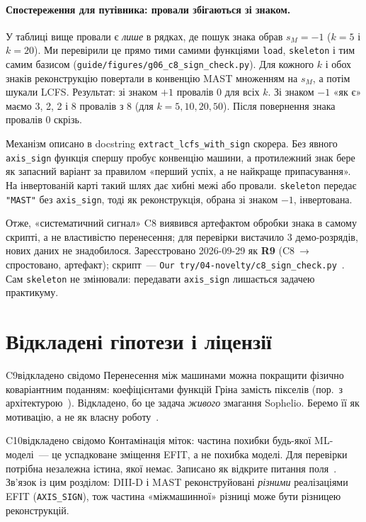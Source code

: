\paragraph{Спостереження для путівника: провали збігаються зі знаком.} У таблиці вище провали є \emph{лише} в рядках, де пошук знака обрав $s_M=-1$ ($k=5$ і $k=20$). Ми перевірили це прямо тими самими функціями \texttt{load}, \texttt{skeleton} і тим самим базисом (\texttt{guide/figures/g06\_c8\_sign\_check.py}). Для кожного $k$ і обох знаків реконструкцію повертали в конвенцію MAST множенням на $s_M$, а потім шукали LCFS. Результат: зі знаком $+1$ провалів 0 для всіх $k$. Зі знаком $-1$ «як є» маємо 3, 2, 2 і 8 провалів з 8 (для $k=5,10,20,50$). Після повернення знака провалів 0 скрізь.

Механізм описано в docstring \texttt{extract\_lcfs\_with\_sign} скорера. Без явного \texttt{axis\_sign} функція спершу пробує конвенцію машини, а протилежний знак бере як запасний варіант за правилом «перший успіх, а не найкраще припасування». На інвертованій карті такий шлях дає хибні межі або провали. \texttt{skeleton} передає \texttt{"MAST"} без \texttt{axis\_sign}, тоді як реконструкція, обрана зі знаком $-1$, інвертована.

Отже, «систематичний сигнал» C8 виявився артефактом обробки знака в самому скрипті, а не властивістю перенесення; для перевірки вистачило 3 демо-розрядів, нових даних не знадобилося. Зареєстровано 2026-09-29 як \textbf{R9} (C8~→ спростовано, артефакт); скрипт~--- \texttt{Our try/04-novelty/c8\_sign\_check.py}~\cite{RegEst,RegConj,RegLog}. Сам \texttt{skeleton} не змінювали: передавати \texttt{axis\_sign} лишається задачею практикуму.

\section{Відкладені гіпотези і ліцензії}\label{sec:g06-deferred}

\begin{itemcard}{C9}{відкладено свідомо}
Перенесення між машинами можна покращити фізично коваріантним поданням: коефіцієнтами функцій Гріна замість пікселів (пор.~з архітектурою~\cite{McClenaghan2024}). Відкладено, бо це задача \emph{живого} змагання Sophelio. Беремо її як мотивацію, а не як власну роботу~\cite{RegConj}.
\end{itemcard}

\begin{itemcard}{C10}{відкладено свідомо}
Контамінація міток: частина похибки будь-якої ML-моделі~--- це успадковане зміщення EFIT, а не похибка моделі. Для перевірки потрібна незалежна істина, якої немає. Записано як відкрите питання поля~\cite{RegConj}. Зв'язок із цим розділом: DIII-D і MAST реконструйовані \emph{різними} реалізаціями EFIT (\texttt{AXIS\_SIGN}), тож частина «міжмашинної» різниці може бути різницею реконструкцій.
\end{itemcard}

